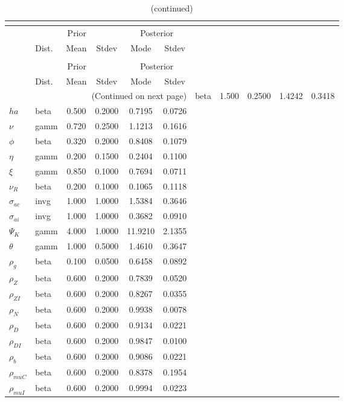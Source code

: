  
\begin{center}
\begin{longtable}{llcccc} 
\caption{Results from posterior maximization (parameters)}\\
 \label{Table:Posterior:1}\\
\toprule 
  & \multicolumn{3}{c}{Prior}  &  \multicolumn{2}{c}{Posterior} \\
  \cmidrule(r{.75em}){2-4} \cmidrule(r{.75em}){5-6}
  & Dist. & Mean  & Stdev & Mode & Stdev \\ 
\midrule \endfirsthead 
\caption{(continued)}\\
 \bottomrule 
  & \multicolumn{3}{c}{Prior}  &  \multicolumn{2}{c}{Posterior} \\
  \cmidrule(r{.75em}){2-4} \cmidrule(r{.75em}){5-6}
  & Dist. & Mean  & Stdev & Mode & Stdev \\ 
\midrule \endhead 
\bottomrule \multicolumn{6}{r}{(Continued on next page)}\endfoot 
\bottomrule\endlastfoot 
${\sigma}$ & beta &   1.500 & 0.2500 &   1.4242 &  0.3418 \\ 
${ha}$ & beta &   0.500 & 0.2000 &   0.7195 &  0.0726 \\ 
$\nu$ & gamm &   0.720 & 0.2500 &   1.1213 &  0.1616 \\ 
${\phi}$ & beta &   0.320 & 0.2000 &   0.8408 &  0.1079 \\ 
${\eta}$ & gamm &   0.200 & 0.1500 &   0.2404 &  0.1100 \\ 
$\xi$ & gamm &   0.850 & 0.1000 &   0.7694 &  0.0711 \\ 
${\nu_R}$ & beta &   0.200 & 0.1000 &   0.1065 &  0.1118 \\ 
${\sigma_{ac}}$ & invg &   1.000 & 1.0000 &   1.5384 &  0.3646 \\ 
${\sigma_{ai}}$ & invg &   1.000 & 1.0000 &   0.3682 &  0.0910 \\ 
${\Psi_{K}}$ & gamm &   4.000 & 1.0000 &  11.9210 &  2.1355 \\ 
${\theta}$ & gamm &   1.000 & 0.5000 &   1.4610 &  0.3647 \\ 
${\rho_g}$ & beta &   0.100 & 0.0500 &   0.6458 &  0.0892 \\ 
${\rho_Z}$ & beta &   0.600 & 0.2000 &   0.7839 &  0.0520 \\ 
${\rho_{ZI}}$ & beta &   0.600 & 0.2000 &   0.8267 &  0.0355 \\ 
${\rho_N}$ & beta &   0.600 & 0.2000 &   0.9938 &  0.0078 \\ 
${\rho_D}$ & beta &   0.600 & 0.2000 &   0.9134 &  0.0221 \\ 
${\rho_{DI}}$ & beta &   0.600 & 0.2000 &   0.9847 &  0.0100 \\ 
${\rho_b}$ & beta &   0.600 & 0.2000 &   0.9086 &  0.0221 \\ 
${\rho_{muC}}$ & beta &   0.600 & 0.2000 &   0.8378 &  0.1954 \\ 
${\rho_{muI}}$ & beta &   0.600 & 0.2000 &   0.9994 &  0.0223 \\ 
\end{longtable}
 \end{center}
